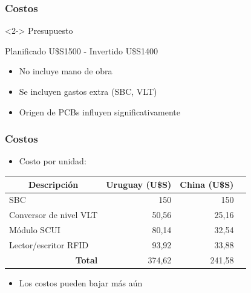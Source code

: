 \documentclass{beamer}
\begin{document}
\begin{frame}
	\frametitle{Costos}
	\begin{block} <2-> {Presupuesto}
		\begin{center}
			Planificado U\$S1500 - Invertido U\$S1400
		\end{center}
	\end{block}

	\bigskip
	\begin{itemize}
		\item <3-> No incluye mano de obra

		\bigskip
		\item <4-> Se incluyen gastos extra (SBC, VLT)

		\bigskip
		\item <5-> Origen de PCBs influyen significativamente
	\end{itemize}
\end{frame}	

\begin{frame}
	\frametitle{Costos}
	\begin{itemize}
		\item[] Costo por unidad:
	\end{itemize}
	
	\begin{table}[htbp]
	\begin{tabular}{|l|r|r|r|}
		\hline
		\multicolumn{1}{|c|}{\textbf{Descripción }} & \multicolumn{1}{c|}{\textbf{Uruguay (U\$S)}} & \multicolumn{1}{c|}{\textbf{China (U\$S)}} \\ \hline
		SBC & 150 & 150 \\ \hline
		Conversor de nivel VLT & 50,56 & 25,16 \\ \hline
		Módulo SCUI & 80,14 & 32,54 \\ \hline
		Lector/escritor RFID & 93,92 & 33,88 \\ \hline
		\multicolumn{1}{|r|}{\textbf{Total}} & 374,62 & 241,58 \\ \hline
	\end{tabular}
	\end{table}
	
	\begin{itemize}
		\item[] Los costos pueden bajar más aún
	\end{itemize}
\end{frame}	
\end{document}
